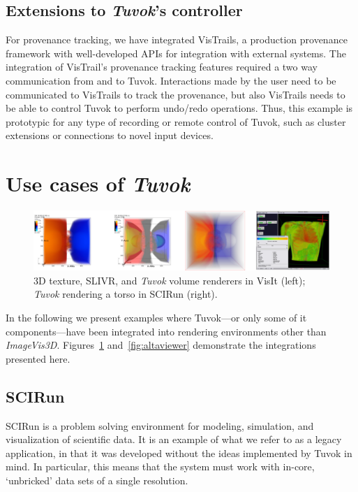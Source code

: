\subsection{Extensions to \textit{Tuvok}'s controller}

For provenance tracking, we have integrated VisTrails, a production
provenance framework with well-developed APIs
for integration with external systems. The integration of
VisTrail’s provenance tracking features required a two way
communication from and to Tuvok. Interactions made by
the user need to be communicated to VisTrails to track the
provenance, but also VisTrails needs to be able to control Tuvok
to perform undo/redo operations. Thus, this example is
prototypic for any type of recording or remote control of Tuvok,
such as cluster extensions or connections to novel input
devices.

\section{Use cases of \textit{Tuvok}}

\begin{figure}
	\includegraphics[width=\linewidth]{images/arch/integration}

  \caption{3D texture, SLIVR, and \textit{Tuvok} volume renderers in
  VisIt (left); \textit{Tuvok} rendering a torso in SCIRun (right).}
	\label{fig:integration}
\end{figure}

In the following we present examples where Tuvok---or only some of it
components---have been integrated into rendering environments other
than
\textit{ImageVis3D}. Figures~\ref{fig:integration}
and~\ref{fig:altaviewer} demonstrate the integrations presented here.

\subsection{SCIRun}

SCIRun is a problem solving environment for modeling,
simulation, and visualization of scientific data. It is an example
of what we refer to as a legacy application, in that it
was developed without the ideas implemented by Tuvok in
mind. In particular, this means that the system must work
with in-core, `unbricked' data sets of a single resolution.

